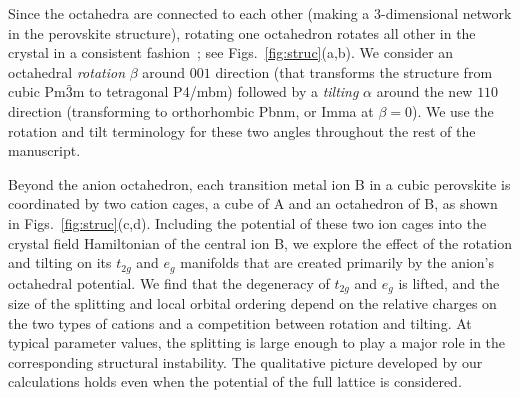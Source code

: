 \documentclass[a4paper,prb,twocolumn]{revtex4-1}  %
\newcommand{\com}[1]{}
\begin{document}

Since the octahedra are connected to each other 
(making a 3-dimensional network in the perovskite structure),
rotating one octahedron rotates all other in the crystal in a consistent fashion~\cite{GlazerAC72};
 see Figs.~\ref{fig:struc}(a,b).
We consider an octahedral \emph{rotation} $\beta$ around $001$ direction
(that transforms the structure from cubic Pm$\bar 3$m to tetragonal P4/mbm)
followed by a \emph{tilting} $\alpha$ around the new $110$ direction
(transforming to orthorhombic Pbnm, 
or Imma 
 at ${\beta=0}$).
We use the rotation and tilt terminology for these 
two angles throughout the rest of the manuscript.


Beyond the anion octahedron,
each transition metal ion B in a cubic perovskite
is coordinated by two cation cages,
a cube of A and an octahedron of B, as shown in Figs.~\ref{fig:struc}(c,d).
Including the 
potential of these two ion cages
into the 
crystal field Hamiltonian of 
the central ion B,
we explore the effect 
of the rotation and tilting on 
its $t_{2g}$ and $e_g$ manifolds
that are
created primarily by the anion's octahedral potential.
We find that the degeneracy of $t_{2g}$ and $e_g$
is lifted, and
the size of the splitting 
and local orbital ordering
depend
on the relative charges on the two types of cations
and a competition between rotation and tilting.
At typical parameter values,
the splitting is large enough 
to play a major role in 
the corresponding structural instability. 
The qualitative picture developed by our calculations 
holds even when the potential of the full lattice is considered.



\com{
$\alpha=0, \beta \neq 0$\\
Tetragonal:
127. P 4 / m b m
$\alpha \neq 0,\beta=0$\\
Orthorhombic:
74. I m m a
$\alpha,\beta \neq 0$\\
Orthorhombic:
62. Pbnm
}
\end{document}
